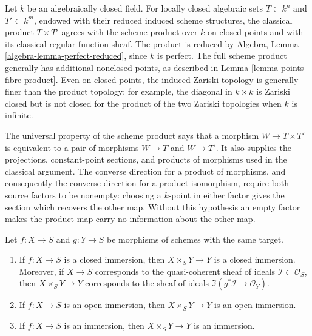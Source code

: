 \begin{remark}
\label{remark-classical-products-varieties}
\begin{reference}
\cite[Chapter II, \S 1, nos. 33 and 35, pp. 225--226 and 228]{FAC}
\end{reference}
Let $k$ be an algebraically closed field. For locally closed algebraic sets
$T \subset k^n$ and $T' \subset k^m$, endowed with their reduced induced
scheme structures, the classical product $T \times T'$ agrees with the
scheme product over $k$ on closed points and with its classical
regular-function sheaf. The product is reduced by
Algebra, Lemma \ref{algebra-lemma-perfect-reduced}, since $k$ is perfect.
The full scheme product generally has additional
nonclosed points, as described in Lemma \ref{lemma-points-fibre-product}.
Even on closed points, the induced Zariski topology is generally finer than
the product topology; for example, the diagonal in $k \times k$ is Zariski
closed but is not closed for the product of the two Zariski topologies when
$k$ is infinite.

The universal property of the scheme product says that a morphism
$W \to T \times T'$ is equivalent to a pair of morphisms $W \to T$ and
$W \to T'$. It also supplies the projections, constant-point sections, and
products of morphisms used in the classical argument. The converse direction
for a product of morphisms, and consequently the converse direction for a
product isomorphism, require both source factors to be nonempty: choosing a
$k$-point in either factor gives the section which recovers the other map.
Without this hypothesis an empty factor makes the product map carry no
information about the other map.
\end{remark}

\begin{lemma}
\label{lemma-fibre-product-immersion}
Let $f : X \to S$ and $g : Y \to S$ be morphisms of schemes
with the same target.
\begin{enumerate}
\item If $f : X \to S$ is a closed immersion,
then $X \times_S Y \to Y$ is a closed immersion.
Moreover, if $X \to S$ corresponds to the quasi-coherent
sheaf of ideals $\mathcal{I} \subset \mathcal{O}_S$, then
$X \times_S Y \to Y$ corresponds to the sheaf of ideals
$\Im(g^*\mathcal{I} \to \mathcal{O}_Y)$.
\item If $f : X \to S$ is an open immersion,
then $X \times_S Y \to Y$ is an open immersion.
\item If $f : X \to S$ is an immersion,
then $X \times_S Y \to Y$ is an immersion.
\end{enumerate}
\end{lemma}

